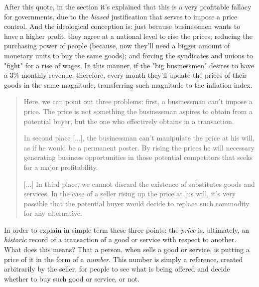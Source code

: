 \documentclass[12pt,a4paper,twoside]{book}
\begin{document}
After this quote, in the section it's explained that this is a very profitable fallacy for governments, due to the \textit{biased} justification that serves to impose a price control. And the ideological conception is: just because businessmen wants to have a higher profit, they agree at a national level to rise the prices; reducing the purchasing power of people (because, now they'll need a bigger amount of monetary units to buy the same goods); and forcing the syndicates and unions to "fight" for a rise of wages. In this manner, if the "big businessmen" desires to have a 3\% monthly revenue, therefore, every month they'll update the prices of their goods in the same magnitude, transferring such magnitude to the inflation index.

\begin{quotation}
Here, we can point out three problems: first, a businessman can't impose a price. The price is not something the businessman aspires to obtain from a potential buyer, but the one who effectively obtains in a transaction.

In second place [...], the businessman can't manipulate the price at his will, as if he would be a permanent poster. By rising the prices he will necessary generating business opportunities in those potential competitors that seeks for a major profitability.

[...] In third place, we cannot discard the existence of substitutes goods and services. In the case of a seller rising up the price at his will, it's very possible that the potential buyer would decide to replace such commodity for any alternative. \cite[pp. 466-467]{elementos-econopol}
\end{quotation}

In order to explain in simple term these three points: the \textit{price} is, ultimately, an \textit{historic} record of a transaction of a good or service with respect to another. What does this means? That a person, when sells a good or service, is putting a price of it in the form of a \textit{number}. This number is simply a reference, created arbitrarily by the seller, for people to see what is being offered and decide whether to buy such good or service, or not.
\end{document}
